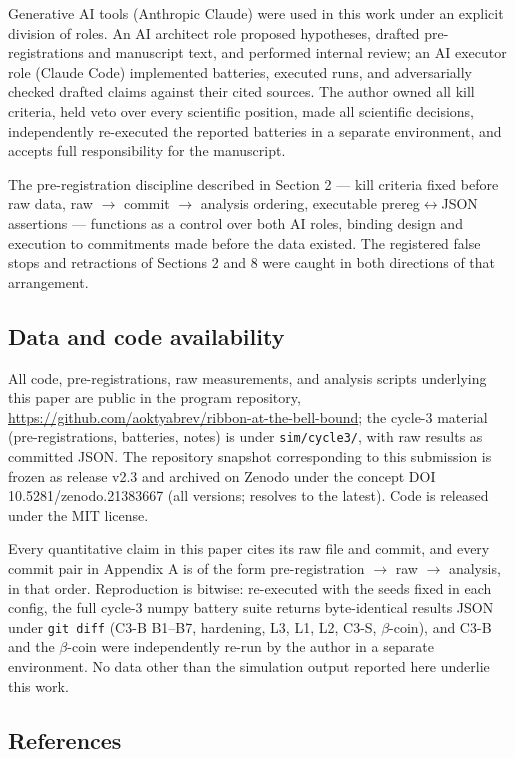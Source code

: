 \documentclass[
  11pt]{article}
\begin{document}
Generative AI tools (Anthropic Claude) were used in this work under an
explicit division of roles. An AI architect role proposed hypotheses,
drafted pre-registrations and manuscript text, and performed internal
review; an AI executor role (Claude Code) implemented batteries, executed
runs, and adversarially checked drafted claims against their cited sources.
The author owned all kill criteria, held veto over every scientific
position, made all scientific decisions, independently re-executed the
reported batteries in a separate environment, and accepts full
responsibility for the manuscript.

The pre-registration discipline described in Section 2 --- kill criteria
fixed before raw data, raw $\to$ commit $\to$ analysis ordering, executable
prereg$\leftrightarrow$JSON assertions --- functions as a control over both AI roles,
binding design and execution to commitments made before the data existed.
The registered false stops and retractions of Sections 2 and 8 were caught
in both directions of that arrangement.

\subsection{Data and code
availability}\label{data-and-code-availability}

All code, pre-registrations, raw measurements, and analysis scripts
underlying this paper are public in the program repository,
\url{https://github.com/aoktyabrev/ribbon-at-the-bell-bound}; the
cycle-3 material (pre-registrations, batteries, notes) is under
\texttt{sim/cycle3/}, with raw results as committed JSON. The repository
snapshot corresponding to this submission is frozen as release v2.3 and
archived on Zenodo under the concept DOI 10.5281/zenodo.21383667 (all
versions; resolves to the latest). Code is released under the MIT
license.

Every quantitative claim in this paper cites its raw file and commit,
and every commit pair in Appendix A is of the form pre-registration $\to$
raw $\to$ analysis, in that order. Reproduction is bitwise: re-executed with
the seeds fixed in each config, the full cycle-3 numpy battery suite
returns byte-identical results JSON under \texttt{git\ diff} (C3-B
B1--B7, hardening, L3, L1, L2, C3-S, $\beta$-coin), and C3-B and the $\beta$-coin
were independently re-run by the author in a separate environment. No
data other than the simulation output reported here underlie this work.

\subsection{References}\label{references}
\end{document}
